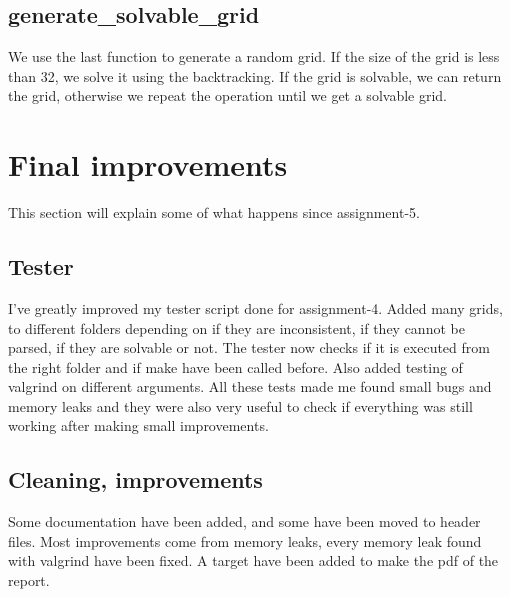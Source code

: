 \documentclass{article}
\begin{document}
\subsection{generate\_solvable\_grid}
We use the last function to generate a random grid. If the size of the grid is less than 32, we solve it using the backtracking. If the grid is solvable, we can return the grid, otherwise we repeat the operation until we get a solvable grid.
\section{Final improvements}
This section will explain some of what happens since assignment-5.
\subsection{Tester}
I've greatly improved my tester script done for assignment-4. Added many grids, to different folders depending on if they are inconsistent, if they cannot be parsed, if they are solvable or not. The tester now checks if it is executed from the right folder and if make have been called before. Also added testing of valgrind on different arguments. All these tests made me found small bugs and memory leaks and they were also very useful to check if everything was still working after making small improvements.
\subsection{Cleaning, improvements}
Some documentation have been added, and some have been moved to header files. Most improvements come from memory leaks, every memory leak found with valgrind have been fixed. A target have been added to make the pdf of the report.
\end{document}
